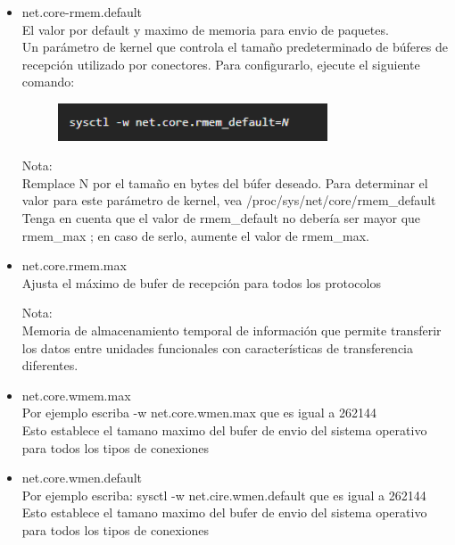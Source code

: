 \begin{itemize}
\item net.core-rmem.default
	\\El valor por default y maximo de memoria para envio de paquetes.
	\\Un parámetro de kernel que controla el tamaño predeterminado de búferes de recepción utilizado por conectores. Para configurarlo, ejecute el siguiente comando:

\begin{figure}[htb]
\begin{center}
\includegraphics[width=8cm]{./Imagenes/ajhordy}
\end{center}
\end{figure}

Nota:
\\Remplace N por el tamaño en bytes del búfer deseado. Para determinar el valor para este parámetro de kernel, vea {/proc/sys/net/core/rmem\_default} 
\\Tenga en cuenta que el valor de rmem\_default no debería ser mayor que rmem\_max ; en caso de serlo, aumente el valor de rmem\_max.

	\item net.core.rmem.max
	\\Ajusta el m\'aximo de bufer de recepci\'on para todos los protocolos
\vspace*{0.10in}


Nota:
\\Memoria de almacenamiento temporal de informaci\'on que permite transferir los datos entre unidades funcionales con caracter\'isticas de transferencia diferentes.




\item net.core.wmem.max
	\\Por ejemplo escriba -w net.core.wmen.max que es igual a 262144
	\\Esto establece el tamano maximo del bufer de envio del sistema operativo para todos los tipos de conexiones

\vspace*{0.10in}



\item net.core.wmen.default
	\\Por ejemplo escriba: sysctl -w net.cire.wmen.default que es igual a 262144
	\\Esto establece el tamano maximo del bufer de envio del sistema operativo para todos los tipos de conexiones


\end{itemize}
